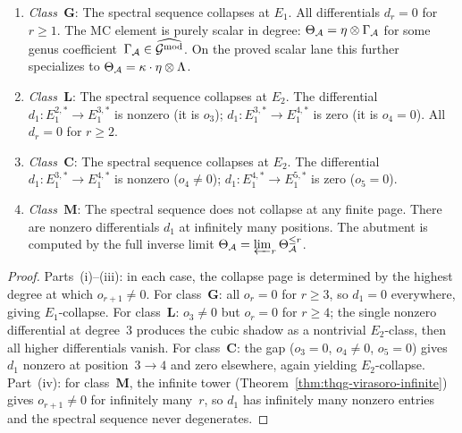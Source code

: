 \begin{proposition}
\ClaimStatusProvedHere
{}
\begin{enumerate}[label=\textup{(\roman*)}]
\item \emph{Class~$\mathbf{G}$}: The spectral sequence
 collapses at $E_1$. All differentials $d_r = 0$ for
 $r \geq 1$. The MC element is purely scalar in degree:
 $\Theta_{\mathcal{A}}=\eta\otimes\Gamma_{\mathcal{A}}$ for some genus
 coefficient~$\Gamma_{\mathcal{A}}\in\widehat{\mathcal{G}^{\mathrm{mod}}}$. On the proved
 scalar lane this further specializes to
 $\Theta_{\mathcal{A}} = \kappa\cdot\eta\otimes\Lambda$.
\item \emph{Class~$\mathbf{L}$}: The spectral sequence
 collapses at $E_2$. The differential $d_1\colon
 E_1^{2,*} \to E_1^{3,*}$ is nonzero (it is $o_3$);
 $d_1\colon E_1^{3,*} \to E_1^{4,*}$ is zero (it is $o_4 = 0$).
 All $d_r = 0$ for $r \geq 2$.
\item \emph{Class~$\mathbf{C}$}: The spectral sequence
 collapses at $E_2$. The differential $d_1\colon
 E_1^{3,*} \to E_1^{4,*}$ is nonzero ($o_4 \neq 0$);
 $d_1\colon E_1^{4,*} \to E_1^{5,*}$ is zero ($o_5 = 0$).
\item \emph{Class~$\mathbf{M}$}: The spectral sequence does
 not collapse at any finite page. There are nonzero
 differentials $d_1$ at infinitely many positions. The
 abutment is computed by the full inverse limit
 $\Theta_{\mathcal{A}} = \varprojlim_r \Theta_{\mathcal{A}}^{\leq r}$.
\end{enumerate}
\end{proposition}

\begin{proof}
Parts~(i)--(iii): in each case, the collapse page is
determined by the highest degree at which $o_{r+1} \neq 0$.
For class~$\mathbf{G}$: all $o_r = 0$ for $r \geq 3$,
so $d_1 = 0$ everywhere, giving $E_1$-collapse.
For class~$\mathbf{L}$: $o_3 \neq 0$ but $o_r = 0$ for
$r \geq 4$; the single nonzero differential at degree~$3$
produces the cubic shadow as a nontrivial $E_2$-class,
then all higher differentials vanish.
For class~$\mathbf{C}$: the gap ($o_3 = 0$, $o_4 \neq 0$,
$o_5 = 0$) gives $d_1$ nonzero at position~$3 \to 4$ and
zero elsewhere, again yielding $E_2$-collapse.
Part~(iv): for class~$\mathbf{M}$, the infinite tower
(Theorem~\ref{thm:thqg-virasoro-infinite}) gives
$o_{r+1} \neq 0$ for infinitely many~$r$, so $d_1$ has
infinitely many nonzero entries and the spectral sequence
never degenerates.
\end{proof}


